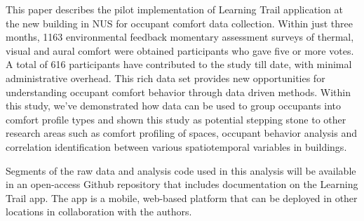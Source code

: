 
This paper describes the pilot implementation of Learning Trail application at the new building in NUS for occupant comfort data collection. Within just three months, 1163 environmental feedback momentary assessment surveys of thermal, visual and aural comfort were obtained participants who gave five or more votes. A total of 616 participants have contributed to the study till date, with minimal administrative overhead. This rich data set provides new opportunities for understanding occupant comfort behavior through data driven methods. Within this study, we've demonstrated how data can be used to group occupants into comfort profile types and shown this study as potential stepping stone to other research areas such as comfort profiling of spaces, occupant behavior analysis and correlation identification between various spatiotemporal variables in buildings. 


Segments of the raw data and analysis code used in this analysis will be available in an open-access Github repository that includes documentation on the Learning Trail app. The app is a mobile, web-based platform that can be deployed in other locations in collaboration with the authors.


